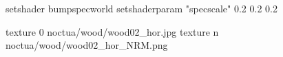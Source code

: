 setshader bumpspecworld
setshaderparam "specscale" 0.2 0.2 0.2

texture 0 noctua/wood/wood02_hor.jpg
texture n noctua/wood/wood02_hor_NRM.png
